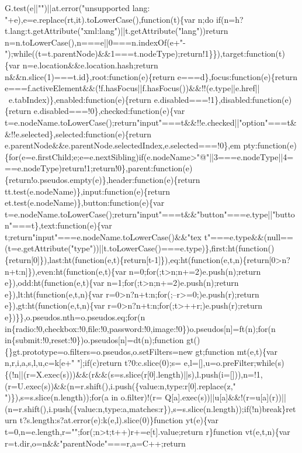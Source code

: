 \begin{DoxyCode}
{       G.test(e||"")||at.error("unsupported lang: "+e),e=e.replace(rt,it).toLowerCase(),function(t)\{var n;do
       if(n=h?t.lang:t.getAttribute("xml:lang")||t.getAttribute("lang"))return
       n=n.toLowerCase(),n===e||0===n.indexOf(e+"-");while((t=t.parentNode)&&1===t.nodeType);return!1\}\}),target:function(t)\{var n=e.location&&e.location.hash;return
       n&&n.slice(1)===t.id\},root:function(e)\{return e===d\},focus:function(e)\{return
       e===f.activeElement&&(!f.hasFocus||f.hasFocus())&&!!(e.type||e.href||~e.tabIndex)\},enabled:function(e)\{return e.disabled===!1\},disabled:function(e)\{return
       e.disabled===!0\},checked:function(e)\{var
       t=e.nodeName.toLowerCase();return"input"===t&&!!e.checked||"option"===t&&!!e.selected\},selected:function(e)\{return
       e.parentNode&&e.parentNode.selectedIndex,e.selected===!0\},em
      pty:function(e)\{for(e=e.firstChild;e;e=e.nextSibling)if(e.nodeName>"@"||3===e.nodeType||4===e.nodeType)return!1;return!0\},parent:function(e)\{return!o.pseudos.empty(e)\},header:function(e)\{return
       tt.test(e.nodeName)\},input:function(e)\{return et.test(e.nodeName)\},button:function(e)\{var
       t=e.nodeName.toLowerCase();return"input"===t&&"button"===e.type||"button"===t\},text:function(e)\{var
       t;return"input"===e.nodeName.toLowerCase()&&"tex
      t"===e.type&&(null==(t=e.getAttribute("type"))||t.toLowerCase()===e.type)\},first:ht(function()\{return[0]\}),last:ht(function(e,t)\{return[t-1]\}),eq:ht(function(e,t,n)\{return[0>n?n+t:n]\}),even:ht(function(e,t)\{var
       n=0;for(;t>n;n+=2)e.push(n);return e\}),odd:ht(function(e,t)\{var n=1;for(;t>n;n+=2)e.push(n);return
       e\}),lt:ht(function(e,t,n)\{var r=0>n?n+t:n;for(;--r>=0;)e.push(r);return e\}),gt:ht(function(e,t,n)\{var
       r=0>n?n+t:n;for(;t>++r;)e.push(r);return e\})\}\},o.pseudos.nth=o.pseudos.eq;for(n
       in\{radio:!0,checkbox:!0,file:!0,password:!0,image:!0\})o.pseudos[n]=ft(n);for(n in\{submit:!0,reset:!0\})o.pseudos[n]=dt(n);function
       gt()\{\}gt.prototype=o.filters=o.pseudos,o.setFilters=new gt;function mt(e,t)\{var n,r,i,a,s,l,u,c=k[e+" "];if(c)return
       t?0:c.slice(0);s=
      e,l=[],u=o.preFilter;while(s)\{(!n||(r=X.exec(s)))&&(r&&(s=s.slice(r[0].length)||s),l.push(i=[])),n=!1,(r=U.exec(s))&&(n=r.shift(),i.push(\{value:n,type:r[0].replace(z," ")\}),s=s.slice(n.length));for(a in
       o.filter)!(r=
      Q[a].exec(s))||u[a]&&!(r=u[a](r))||(n=r.shift(),i.push(\{value:n,type:a,matches:r\}),s=s.slice(n.length));if(!n)break\}return t?s.length:s?at.error(e):k(e,l).slice(0)\}function yt(e)\{var
       t=0,n=e.length,r="";for(;n>t;t++)r+=e[t].value;return r\}function vt(e,t,n)\{var r=t.dir,o=n&&"parentNode"===r,a=C++;return
}
\end{DoxyCode}
